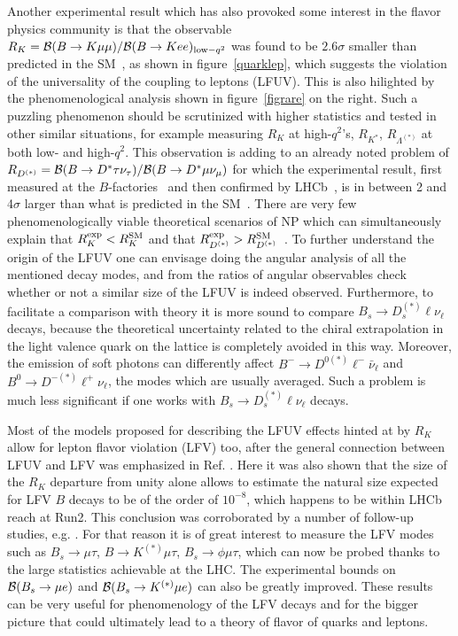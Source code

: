 Another experimental result which has also provoked some interest in the flavor physics community is that the observable $R_K = {\cal B}(B\rightarrow K\mu\mu)/{\cal B}(B\rightarrow Kee)_{{\rm low}-q^2}$  was found to be $2.6\sigma$ smaller than  predicted in the SM~\cite{Aaij:2014ora}, as shown in figure~\ref{quarklep}, which suggests the violation of the universality of the coupling to leptons (LFUV). This is also hilighted by the phenomenological analysis shown in figure~\ref{figrare} on the right. Such a puzzling phenomenon should be scrutinized with higher statistics and tested in other similar situations, 
for example measuring $R_K$ at high-$q^2$'s, $R_{K^\ast}$, $R_{\Lambda^{(\ast )}}$ at both low- and high-$q^2$. This observation is adding to an already noted problem of $R_{D^{(\ast)}}=  {\cal B}(B\rightarrow D^{\ast}\tau\nu_\tau)/{\cal B}(B\rightarrow D^{\ast}\mu\nu_\mu)$ for which the experimental result, first measured at the $B$-factories~\cite{Huschle:2015rga} and then confirmed by LHCb~\cite{Aaij:2015yra}, is in between 2 and 4$\sigma$ larger than what is predicted in the SM~\cite{bib:hfag}. There are very few phenomenologically viable theoretical scenarios of NP which can simultaneously explain that $R_K^{\rm exp}<R_K^{\rm SM}$ and that $R_{D^{(\ast )}}^{\rm exp} > R_{D^{(\ast )}}^{\rm SM}$~\cite{Bhattacharya:2014wla}. To further understand the origin of the LFUV one can envisage doing the angular analysis of all the mentioned decay modes, and from the ratios of angular observables check whether or not a similar size of the LFUV is indeed observed. 
Furthermore, to facilitate a comparison with theory it is more sound to compare $B_s\to D_s^{(\ast)}\ell \nu_\ell$ decays, because the theoretical uncertainty related to the chiral extrapolation in the light valence quark on the lattice is completely avoided in this way. Moreover, the emission of soft photons can differently affect $B^- \to D^{0 (\ast)}\ell^- \bar \nu_\ell$ and $B^0 \to D^{- (\ast)}\ell^+ \nu_\ell$, the modes which are usually averaged. Such a problem is much less significant if one works with $B_s\to D_s^{(\ast)}\ell \nu_\ell$ decays. 

Most of the models proposed for describing the LFUV effects hinted at by $R_K$
allow for lepton flavor violation (LFV) too, after the general connection
between LFUV and LFV was emphasized in Ref. \cite{Glashow:2014iga}. Here it
was also shown that the size of the $R_K$ departure from unity alone allows
to estimate the natural size expected for LFV $B$ decays to be of the order 
of $10^{-8}$, which happens to be within LHCb reach at Run2. This conclusion
was corroborated by a number of follow-up studies, e.g.
\cite{Guadagnoli:2015nra,Boucenna:2015raa}. For that reason it is of great interest to measure the LFV modes such as $B_s\to \mu \tau$, $B\to K^{(\ast )}\mu \tau$,  $B_s\to \phi \mu \tau$, which can now be probed thanks to the large statistics achievable at the LHC. The experimental bounds on ${\cal B}(B_s\rightarrow \mu e)$ and ${\cal B}(B_s\rightarrow K^{(\ast )} \mu e)$ can also be greatly improved. These results can be very useful for phenomenology of the LFV decays and for the bigger picture that could ultimately lead to a theory of flavor of quarks and leptons. 




